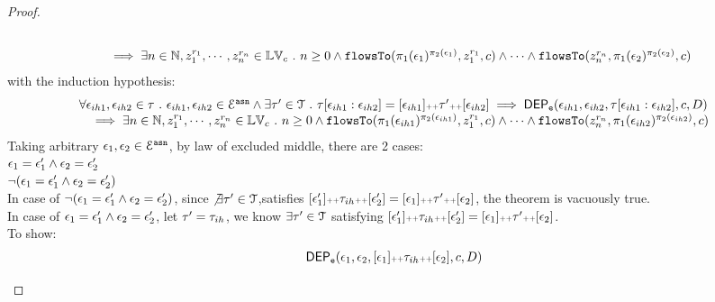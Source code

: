 \begin{proof}
\begin{case}
\[\begin{array}{l}
          \\ \quad 
          \implies 
          \exists n \in \mathbb{N}, z_1^{r_1}, \cdots, z_n^{r_n} \in \mathbb{LV}_{{c}} ~.~ n \geq 0 \land
          \mathtt{flowsTo}(\pi_1(\mathtt{\epsilon}_1)^{\pi_2(\mathtt{\epsilon}_1)},  z_1^{r_1}, c) 
          \land \cdots \land \mathtt{flowsTo}(z_n^{r_n}, \pi_1(\mathtt{\epsilon}_2)^{\pi_2(\mathtt{\epsilon}_2)}, c) 
        \end{array}
        \]
        with the induction hypothesis:
        \[
          \begin{array}{l}
            \forall \mathtt{\epsilon}_{ih1}, \mathtt{\epsilon}_{ih2} \in \mathtt{\tau} ~.~ \mathtt{\epsilon}_{ih1}, \mathtt{\epsilon}_{ih2} \in \mathcal{E}^{\mathtt{{asn}}} 
            \land
             \exists \mathtt{\tau}' \in \mathcal{T} ~.~ 
             \mathtt{\tau}[\mathtt{\epsilon}_{ih1}:\mathtt{\epsilon}_{ih2}] = [\mathtt{\epsilon}_{ih1}] {\scriptscriptstyle ++} \mathtt{\tau}' {\scriptscriptstyle ++} [\mathtt{\epsilon}_{ih2}]
            \implies
            \mathsf{DEP_{\mathtt{e}}}(\mathtt{\epsilon}_{ih1}, \mathtt{\epsilon}_{ih2}, \mathtt{\tau}[\mathtt{\epsilon}_{ih1}:\mathtt{\epsilon}_{ih2}], c, D) 
            \\ \quad 
            \implies 
            \exists n \in \mathbb{N}, z_1^{r_1}, \cdots, z_n^{r_n} \in \mathbb{LV}_{{c}} ~.~ n \geq 0 \land
            \mathtt{flowsTo}(\pi_1(\mathtt{\epsilon}_{ih1})^{\pi_2(\mathtt{\epsilon}_{ih1})},  z_1^{r_1}, c) 
            \land \cdots \land \mathtt{flowsTo}(z_n^{r_n}, \pi_1(\mathtt{\epsilon}_{ih2})^{\pi_2(\mathtt{\epsilon}_{ih2})}, c) 
          \end{array}
        \]
        Taking arbitrary $ \mathtt{\epsilon}_1, \mathtt{\epsilon}_2 \in \mathcal{E}^{\mathtt{{asn}}}$, by law of excluded middle, there are 2 cases:
        \\
        $\mathtt{\epsilon}_1 = \mathtt{\epsilon}_1' \land  \mathtt{\epsilon}_2 = \mathtt{\epsilon}_2'$
        \\
        $\neg(\mathtt{\epsilon}_1 = \mathtt{\epsilon}_1' \land  \mathtt{\epsilon}_2 = \mathtt{\epsilon}_2')$
        \\
        In case of $\neg(\mathtt{\epsilon}_1 = \mathtt{\epsilon}_1' \land  \mathtt{\epsilon}_2 = \mathtt{\epsilon}_2')$, since 
        $\not\exists \mathtt{\tau}' \in \mathcal{T}$,satisfies $
        [\mathtt{\epsilon}_1'] {\scriptscriptstyle ++} \mathtt{\tau}_{ih} {\scriptscriptstyle ++} [\mathtt{\epsilon}_2']  = [\mathtt{\epsilon}_1] {\scriptscriptstyle ++} \mathtt{\tau}' {\scriptscriptstyle ++} [\mathtt{\epsilon}_2]$, 
        the theorem is vacuously true.
        \\
        In case of $\mathtt{\epsilon}_1 = \mathtt{\epsilon}_1' \land  \mathtt{\epsilon}_2 = \mathtt{\epsilon}_2'$,
        let $\mathtt{\tau}' = \mathtt{\tau}_{ih}$, we know $\exists \mathtt{\tau}' \in \mathcal{T}$ satisfying 
        $[\mathtt{\epsilon}_1'] {\scriptscriptstyle ++} \mathtt{\tau}_{ih} {\scriptscriptstyle ++} [\mathtt{\epsilon}_2'] = [\mathtt{\epsilon}_1] {\scriptscriptstyle ++} \mathtt{\tau}' {\scriptscriptstyle ++} [\mathtt{\epsilon}_2]$.
        \\
        To show:
        \[
          \begin{array}{l}
            \mathsf{DEP_{\mathtt{e}}}(\mathtt{\epsilon}_1, \mathtt{\epsilon}_2, [\mathtt{\epsilon}_1] {\scriptscriptstyle ++} \mathtt{\tau}_{ih} {\scriptscriptstyle ++} [\mathtt{\epsilon}_2], c, D) 

\end{array}\]
\end{case}
\end{proof}
